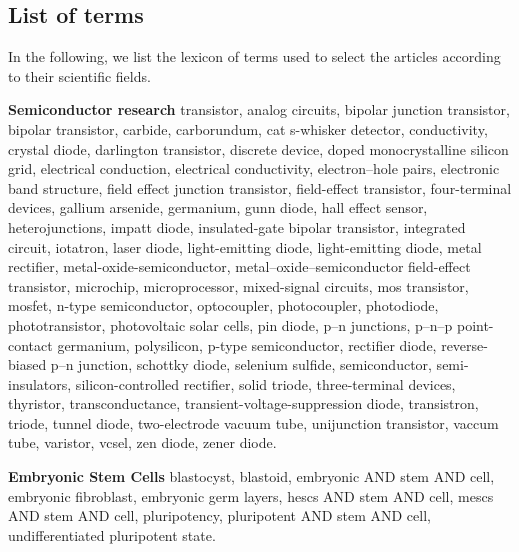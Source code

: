 \documentclass[draft,final]{vutinfth} %
\begin{document}
\subsection{List of terms}
\label{app:list}
In the following, we list the lexicon of terms used to select the articles according to their scientific fields.

\vspace{2mm}\noindent\textbf{Semiconductor research}
transistor, analog circuits, bipolar junction transistor, bipolar transistor, 
 carbide,
 carborundum,
 cat s-whisker detector,
 conductivity,
 crystal diode,
 darlington transistor,
 discrete device,
 doped monocrystalline silicon grid,
 electrical conduction,
 electrical conductivity,
 electron–hole pairs,
 electronic band structure,
 field effect junction transistor,
 field-effect transistor,
 four-terminal devices,
 gallium arsenide,
 germanium,
 gunn diode,
 hall effect sensor,
 heterojunctions,
 impatt diode,
 insulated-gate bipolar transistor,
 integrated circuit,
 iotatron,
 laser diode,
 light-emitting diode,
 light-emitting diode,
 metal rectifier,
 metal-oxide-semiconductor,
 metal–oxide–semiconductor field-effect transistor,
 microchip,
 microprocessor,
 mixed-signal circuits,
 mos transistor,
 mosfet,
 n-type semiconductor,
 optocoupler,
 photocoupler,
 photodiode,
 phototransistor,
 photovoltaic solar cells,
 pin diode,
 p–n junctions,
 p–n–p point-contact germanium,
 polysilicon,
 p-type semiconductor,
 rectifier diode,
 reverse-biased p–n junction,
 schottky diode,
 selenium sulfide,
 semiconductor,
 semi-insulators,
 silicon-controlled rectifier,
 solid triode,
 three-terminal devices,
 thyristor,
 transconductance,
 transient-voltage-suppression diode,
 transistron,
 triode,
 tunnel diode,
 two-electrode vacuum tube,
 unijunction transistor,
 vaccum tube,
 varistor,
 vcsel,
 zen diode,
 zener diode.

\vspace{2mm}\noindent\textbf{Embryonic Stem Cells}
blastocyst,
 blastoid,
 embryonic AND stem AND  cell,
 embryonic fibroblast,
 embryonic germ layers,
 hescs AND stem AND cell,
 mescs AND stem AND cell,
 pluripotency,
 pluripotent AND stem AND cell,
 undifferentiated pluripotent state.
\end{document}
